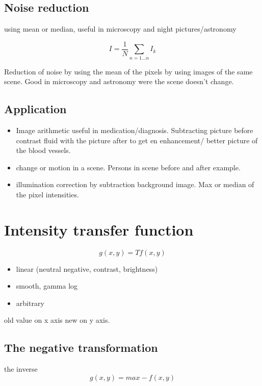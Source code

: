 \subsection*{Noise reduction}
using mean or median, useful in microscopy and night pictures/astronomy

\begin{equation}
I =  \frac{1} {N} \sum_{n=1 \ldots n }I_k
\end{equation}

Reduction of noise by using the mean of the pixels by using images of the same scene. Good in microscopy and astronomy were the scene doesn't change. 

\subsection*{Application}

\begin{itemize}
    \item Image arithmetic useful in medication/diagnosis. Subtracting picture before contrast fluid with the picture after to get en enhancement/ better picture of the blood vessels. 
    \item change or motion in a scene. Persons in scene before and after example. 
    \item illumination correction by subtraction background image. Max or median of the pixel intensities. 
\end{itemize}


\section{Intensity transfer function}

\begin{equation}
g(x,y) = Tf(x,y)
\end{equation}

\begin{itemize}
    \item linear (neutral negative, contrast, brightness)
    \item smooth, gamma log
    \item arbitrary
\end{itemize}

old value on x axis new on y axis.

\subsection*{The negative transformation}
the inverse 
\begin{equation}
g(x,y) = max - f(x,y)
\end{equation}


